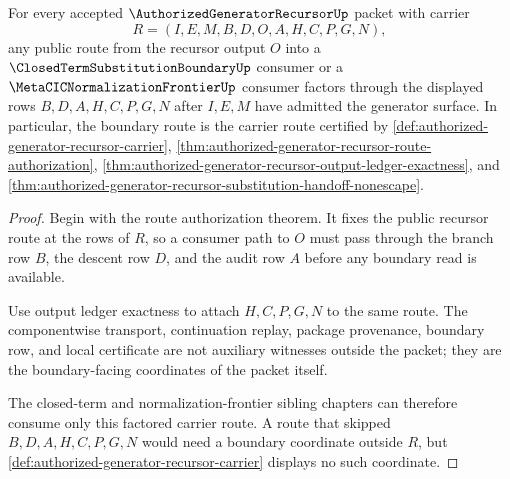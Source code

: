 \begin{theorem}
\label{thm:authorized-generator-recursor-boundary-factorization}
For every accepted $\AuthorizedGeneratorRecursorUp$ packet with carrier
$$
R=(I,E,M,B,D,O,A,H,C,P,G,N),
$$
any public route from the recursor output $O$ into a $\ClosedTermSubstitutionBoundaryUp$ consumer or a $\MetaCICNormalizationFrontierUp$ consumer factors through the displayed rows $B,D,A,H,C,P,G,N$ after $I,E,M$ have admitted the generator surface. In particular, the boundary route is the carrier route certified by \autoref{def:authorized-generator-recursor-carrier}, \autoref{thm:authorized-generator-recursor-route-authorization}, \autoref{thm:authorized-generator-recursor-output-ledger-exactness}, and \autoref{thm:authorized-generator-recursor-substitution-handoff-nonescape}.
\end{theorem}
\begin{proof}
Begin with the route authorization theorem. It fixes the public recursor route at the rows of $R$, so a consumer path to $O$ must pass through the branch row $B$, the descent row $D$, and the audit row $A$ before any boundary read is available.

Use output ledger exactness to attach $H,C,P,G,N$ to the same route. The componentwise transport, continuation replay, package provenance, boundary row, and local certificate are not auxiliary witnesses outside the packet; they are the boundary-facing coordinates of the packet itself.

The closed-term and normalization-frontier sibling chapters can therefore consume only this factored carrier route. A route that skipped $B,D,A,H,C,P,G,N$ would need a boundary coordinate outside $R$, but \autoref{def:authorized-generator-recursor-carrier} displays no such coordinate.
\end{proof}


